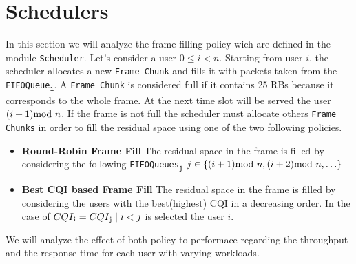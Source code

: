 \section{Schedulers}
  In this section we will analyze the frame filling policy wich are defined in the module \texttt{Scheduler}.
  Let's consider a user \(0\leq i < n\). Starting from user \(i\), the scheduler allocates a new \texttt{Frame Chunk} and fills it with packets taken from the \texttt{FIFOQueue\textsubscript{i}}. A \texttt{Frame Chunk} is considered full if it contains 25 RBs because it corresponds to the whole frame. At the next time slot will be served the user \((i+1)\textnormal{mod }n\). If the frame is not full the scheduler must allocate others \texttt{Frame Chunks} in order to fill the residual space using one of the two following policies. 

\begin{itemize}
  \item \textbf{Round-Robin Frame Fill}
  The residual space  in the frame is filled by considering the following \texttt{FIFOQueues\textsubscript{j}} \(j \in \{ (i+1)\textnormal{mod } n,(i+2)\textnormal{mod }n,\ldots \} \)
  \item \textbf{Best CQI based Frame Fill}
   The residual space in the frame is filled by considering the users with the best(highest) CQI in a decreasing order. In the case of \(CQI\textsubscript{i}=CQI\textsubscript{j} \mid i < j\) is selected the user \(i\).
\end{itemize}
We will analyze the effect of both policy to performace regarding the throughput and the response time for each user with varying workloads.

